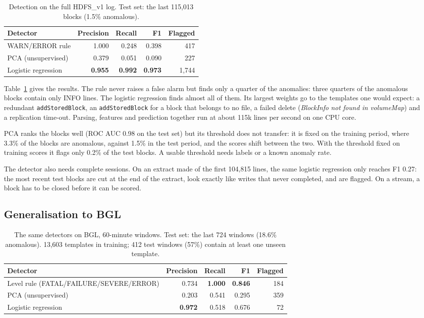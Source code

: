 \documentclass[11pt,a4paper]{article}
\newcommand{\code}[1]{\texttt{#1}}
\begin{document}
\begin{table}[t]
\centering
\caption{Detection on the full HDFS\_v1 log. Test set: the last 115,013 blocks (1.5\% anomalous).}
\label{tab:hdfs}
\begin{tabular}{lrrrr}
\toprule
Detector & Precision & Recall & F1 & Flagged \\
\midrule
WARN/ERROR rule & 1.000 & 0.248 & 0.398 & 417 \\
PCA (unsupervised) & 0.379 & 0.051 & 0.090 & 227 \\
Logistic regression & \textbf{0.955} & \textbf{0.992} & \textbf{0.973} & 1,744 \\
\bottomrule
\end{tabular}
\end{table}

Table~\ref{tab:hdfs} gives the results. The rule never raises a false alarm but finds only a
quarter of the anomalies: three quarters of the anomalous blocks contain only INFO lines. The
logistic regression finds almost all of them. Its largest weights go to the templates one
would expect: a redundant \code{addStoredBlock}, an \code{addStoredBlock} for a block that
belongs to no file, a failed delete (\emph{BlockInfo not found in volumeMap}) and a replication
time-out. Parsing, features and prediction together run at about 115k lines per second on one
CPU core.

PCA ranks the blocks well (ROC AUC 0.98 on the test set) but its threshold does not transfer:
it is fixed on the training period, where 3.3\% of the blocks are anomalous, against 1.5\% in
the test period, and the scores shift between the two. With the threshold fixed on training
scores it flags only 0.2\% of the test blocks. A usable threshold needs labels or a known
anomaly rate.

The detector also needs complete sessions. On an extract made of the first 104,815 lines, the
same logistic regression only reaches F1 0.27: the most recent test blocks are cut at the end
of the extract, look exactly like writes that never completed, and are flagged. On a stream,
a block has to be closed before it can be scored.

\subsection{Generalisation to BGL}

\begin{table}[t]
\centering
\caption{The same detectors on BGL, 60-minute windows. Test set: the last 724 windows (18.6\% anomalous).
13,603 templates in training; 412 test windows (57\%) contain at least one unseen template.}
\label{tab:bgl}
\begin{tabular}{lrrrr}
\toprule
Detector & Precision & Recall & F1 & Flagged \\
\midrule
Level rule (FATAL/FAILURE/SEVERE/ERROR) & 0.734 & \textbf{1.000} & \textbf{0.846} & 184 \\
PCA (unsupervised) & 0.203 & 0.541 & 0.295 & 359 \\
Logistic regression & \textbf{0.972} & 0.518 & 0.676 & 72 \\
\bottomrule
\end{tabular}
\end{table}
\end{document}
